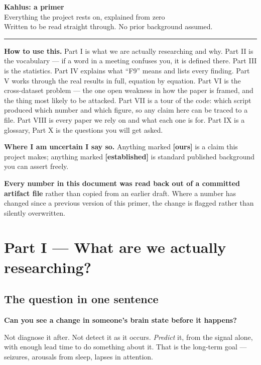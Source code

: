 \documentclass[11pt]{article}
\begin{document}
\begin{center}
{\LARGE\bfseries Kahlus: a primer}\\[6pt]
{\large Everything the project rests on, explained from zero}\\[12pt]
{\small Written to be read straight through. No prior background assumed.}
\end{center}

\vspace{4pt}\hrule\vspace{8pt}

\begin{keybox}
\textbf{How to use this.} Part I is what we are actually researching and why.
Part II is the vocabulary --- if a word in a meeting confuses you, it is defined
there. Part III is the statistics. Part IV explains what ``F9'' means and lists
every finding. Part V works through the real results in full, equation by
equation. Part VI is the cross-dataset problem --- the one open weakness in how
the paper is framed, and the thing most likely to be attacked. Part VII is a tour
of the code: which script produced which number and which figure, so any claim
here can be traced to a file. Part VIII is every paper we rely on and what each
one is for. Part IX is a glossary, Part X is the questions you will get asked.

\textbf{Where I am uncertain I say so.} Anything marked \textbf{[ours]} is a claim
this project makes; anything marked \textbf{[established]} is standard published
background you can assert freely.

\textbf{Every number in this document was read back out of a committed artifact
file} rather than copied from an earlier draft. Where a number has changed since
a previous version of this primer, the change is flagged rather than silently
overwritten.
\end{keybox}

\section{Part I --- What are we actually researching?}

\subsection{The question in one sentence}

\textbf{Can you see a change in someone's brain state before it happens?}

Not diagnose it after. Not detect it as it occurs. \emph{Predict} it, from the
signal alone, with enough lead time to do something about it. That is the
long-term goal --- seizures, arousals from sleep, lapses in attention.
\end{document}

